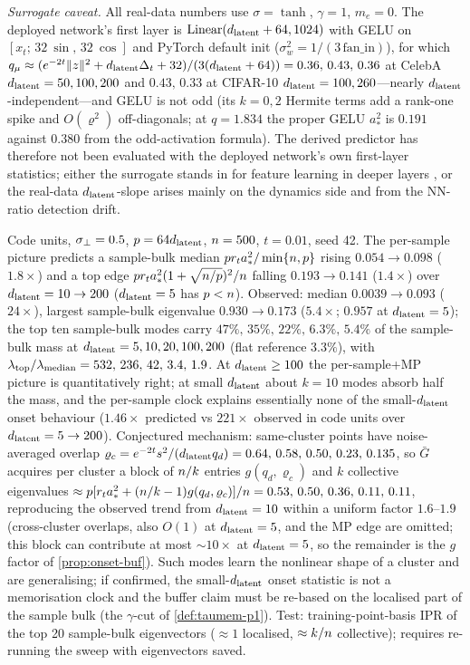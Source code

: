 \emph{Surrogate caveat.} All real-data numbers use $\sigma=\tanh$, $\gamma=1$, $m_e=0$. The deployed network's first layer is $\mathrm{Linear}(d_{\mathrm{latent}}+64,1024)$ with GELU on $[x_t;\,32\ \sin,\,32\ \cos]$ and PyTorch default init ($\sigma_w^2=1/(3\,\mathrm{fan\_in})$), for which $q_\mu\approx(e^{-2t}\|z\|^2+d_{\mathrm{latent}}\Delta_t+32)/(3(d_{\mathrm{latent}}+64))=0.36,\,0.43,\,0.36$ at CelebA $d_{\mathrm{latent}}=50,100,200$ and $0.43,\,0.33$ at CIFAR-10 $d_{\mathrm{latent}}=100,260$---nearly $d_{\mathrm{latent}}$-independent---and GELU is not odd (its $k=0,2$ Hermite terms add a rank-one spike and $O(\varrho^2)$ off-diagonals; at $q=1.834$ the proper GELU $a_*^2$ is $0.191$ against $0.380$ from the odd-activation formula). The derived predictor has therefore not been evaluated with the deployed network's own first-layer statistics; either the surrogate stands in for feature learning in deeper layers \citep{ba2022highdimensional}, or the real-data $d_{\mathrm{latent}}$-slope arises mainly on the dynamics side and from the NN-ratio detection drift.

\begin{remark}\label{rem:collective-pred}
Code units, $\sigma_{\perp}=0.5$, $p=64d_{\mathrm{latent}}$, $n=500$, $t=0.01$, seed 42. The per-sample picture predicts a sample-bulk median $p r_ta_*^2/\min\{n,p\}$ rising $0.054\to0.098$ ($1.8\times$) and a top edge $p r_ta_*^2(1+\sqrt{n/p})^2/n$ falling $0.193\to0.141$ ($1.4\times$) over $d_{\mathrm{latent}}=10\to200$ ($d_{\mathrm{latent}}=5$ has $p<n$). Observed: median $0.0039\to0.093$ ($24\times$), largest sample-bulk eigenvalue $0.930\to0.173$ ($5.4\times$; $0.957$ at $d_{\mathrm{latent}}=5$); the top ten sample-bulk modes carry $47\%,\,35\%,\,22\%,\,6.3\%,\,5.4\%$ of the sample-bulk mass at $d_{\mathrm{latent}}=5,10,20,100,200$ (flat reference $3.3\%$), with $\lambda_{\rm top}/\lambda_{\rm median}=532,\,236,\,42,\,3.4,\,1.9$. At $d_{\mathrm{latent}}\ge100$ the per-sample+MP picture is quantitatively right; at small $d_{\mathrm{latent}}$ about $k=10$ modes absorb half the mass, and the per-sample clock explains essentially none of the small-$d_{\mathrm{latent}}$ onset behaviour ($1.46\times$ predicted vs $221\times$ observed in code units over $d_{\mathrm{latent}}=5\to200$). Conjectured mechanism: same-cluster points have noise-averaged overlap $\varrho_c=e^{-2t}s^2/(d_{\mathrm{latent}} q_d)=0.64,\,0.58,\,0.50,\,0.23,\,0.135$, so $\bar G$ acquires per cluster a block of $n/k$ entries $g(q_d,\varrho_c)$ and $k$ collective eigenvalues $\approx p[r_ta_*^2+(n/k-1)g(q_d,\varrho_c)]/n=0.53,\,0.50,\,0.36,\,0.11,\,0.11$, reproducing the observed trend from $d_{\mathrm{latent}}=10$ within a uniform factor $1.6$--$1.9$ (cross-cluster overlaps, also $O(1)$ at $d_{\mathrm{latent}}=5$, and the MP edge are omitted; this block can contribute at most $\sim10\times$ at $d_{\mathrm{latent}}=5$, so the remainder is the $g$ factor of \cref{prop:onset-buf}). Such modes learn the nonlinear shape of a cluster and are generalising; if confirmed, the small-$d_{\mathrm{latent}}$ onset statistic is not a memorisation clock and the buffer claim must be re-based on the localised part of the sample bulk (the $\gamma$-cut of \cref{def:taumem-p1}). Test: training-point-basis IPR of the top 20 sample-bulk eigenvectors ($\approx1$ localised, $\approx k/n$ collective); requires re-running the sweep with eigenvectors saved.
\end{remark}

